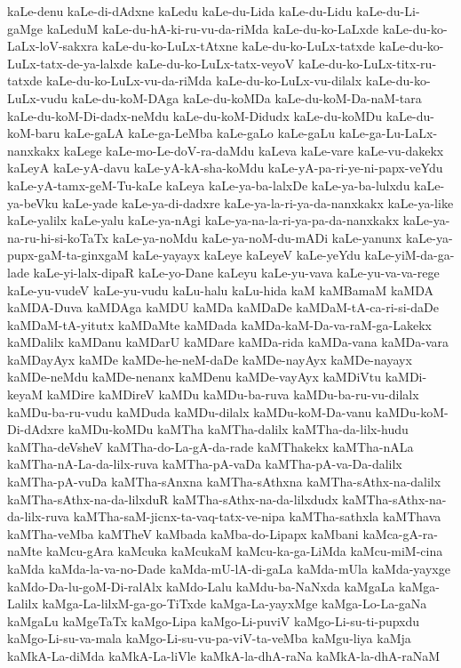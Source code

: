 {kaLe-denu
kaLe-di-dAdxne
kaLedu
kaLe-du-Lida
kaLe-du-Lidu
kaLe-du-Li-gaMge
kaLeduM
kaLe-du-hA-ki-ru-vu-da-riMda
kaLe-du-ko-LaLxde
kaLe-du-ko-LaLx-loV-sakxra
kaLe-du-ko-LuLx-tAtxne
kaLe-du-ko-LuLx-tatxde
kaLe-du-ko-LuLx-tatx-de-ya-lalxde
kaLe-du-ko-LuLx-tatx-veyoV
kaLe-du-ko-LuLx-titx-ru-tatxde
kaLe-du-ko-LuLx-vu-da-riMda
kaLe-du-ko-LuLx-vu-dilalx
kaLe-du-ko-LuLx-vudu
kaLe-du-koM-DAga
kaLe-du-koMDa
kaLe-du-koM-Da-naM-tara
kaLe-du-koM-Di-dadx-neMdu
kaLe-du-koM-Didudx
kaLe-du-koMDu
kaLe-du-koM-baru
kaLe-gaLA
kaLe-ga-LeMba
kaLe-gaLo
kaLe-gaLu
kaLe-ga-Lu-LaLx-nanxkakx
kaLege
kaLe-mo-Le-doV-ra-daMdu
kaLeva
kaLe-vare
kaLe-vu-dakekx
kaLeyA
kaLe-yA-davu
kaLe-yA-kA-sha-koMdu
kaLe-yA-pa-ri-ye-ni-papx-veYdu
kaLe-yA-tamx-geM-Tu-kaLe
kaLeya
kaLe-ya-ba-lalxDe
kaLe-ya-ba-lulxdu
kaLe-ya-beVku
kaLe-yade
kaLe-ya-di-dadxre
kaLe-ya-la-ri-ya-da-nanxkakx
kaLe-ya-like
kaLe-yalilx
kaLe-yalu
kaLe-ya-nAgi
kaLe-ya-na-la-ri-ya-pa-da-nanxkakx
kaLe-ya-na-ru-hi-si-koTaTx
kaLe-ya-noMdu
kaLe-ya-noM-du-mADi
kaLe-yanunx
kaLe-ya-pupx-gaM-ta-ginxgaM
kaLe-yayayx
kaLeye
kaLeyeV
kaLe-yeYdu
kaLe-yiM-da-ga-lade
kaLe-yi-lalx-dipaR
kaLe-yo-Dane
kaLeyu
kaLe-yu-vava
kaLe-yu-va-va-rege
kaLe-yu-vudeV
kaLe-yu-vudu
kaLu-halu
kaLu-hida
kaM
kaMBamaM
kaMDA
kaMDA-Duva
kaMDAga
kaMDU
kaMDa
kaMDaDe
kaMDaM-tA-ca-ri-si-daDe
kaMDaM-tA-yitutx
kaMDaMte
kaMDada
kaMDa-kaM-Da-va-raM-ga-Lakekx
kaMDalilx
kaMDanu
kaMDarU
kaMDare
kaMDa-rida
kaMDa-vana
kaMDa-vara
kaMDayAyx
kaMDe
kaMDe-he-neM-daDe
kaMDe-nayAyx
kaMDe-nayayx
kaMDe-neMdu
kaMDe-nenanx
kaMDenu
kaMDe-vayAyx
kaMDiVtu
kaMDi-keyaM
kaMDire
kaMDireV
kaMDu
kaMDu-ba-ruva
kaMDu-ba-ru-vu-dilalx
kaMDu-ba-ru-vudu
kaMDuda
kaMDu-dilalx
kaMDu-koM-Da-vanu
kaMDu-koM-Di-dAdxre
kaMDu-koMDu
kaMTha
kaMTha-dalilx
kaMTha-da-lilx-hudu
kaMTha-deVsheV
kaMTha-do-La-gA-da-rade
kaMThakekx
kaMTha-nALa
kaMTha-nA-La-da-lilx-ruva
kaMTha-pA-vaDa
kaMTha-pA-va-Da-dalilx
kaMTha-pA-vuDa
kaMTha-sAnxna
kaMTha-sAthxna
kaMTha-sAthx-na-dalilx
kaMTha-sAthx-na-da-lilxduR
kaMTha-sAthx-na-da-lilxdudx
kaMTha-sAthx-na-da-lilx-ruva
kaMTha-saM-jicnx-ta-vaq-tatx-ve-nipa
kaMTha-sathxla
kaMThava
kaMTha-veMba
kaMTheV
kaMbada
kaMba-do-Lipapx
kaMbani
kaMca-gA-ra-naMte
kaMcu-gAra
kaMcuka
kaMcukaM
kaMcu-ka-ga-LiMda
kaMcu-miM-cina
kaMda
kaMda-la-va-no-Dade
kaMda-mU-lA-di-gaLa
kaMda-mUla
kaMda-yayxge
kaMdo-Da-lu-goM-Di-ralAlx
kaMdo-Lalu
kaMdu-ba-NaNxda
kaMgaLa
kaMga-Lalilx
kaMga-La-lilxM-ga-go-TiTxde
kaMga-La-yayxMge
kaMga-Lo-La-gaNa
kaMgaLu
kaMgeTaTx
kaMgo-Lipa
kaMgo-Li-puviV
kaMgo-Li-su-ti-pupxdu
kaMgo-Li-su-va-mala
kaMgo-Li-su-vu-pa-viV-ta-veMba
kaMgu-liya
kaMja
kaMkA-La-diMda
kaMkA-La-liVle
kaMkA-la-dhA-raNa
kaMkA-la-dhA-raNaM
}

